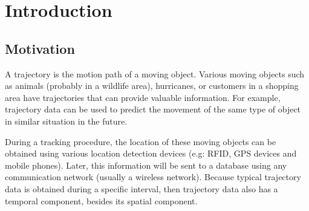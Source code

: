 \chapter{Introduction}
\label{chap:intro}

\section{Motivation}
\label{sec:motivation}

A trajectory is the motion path of a moving object.
Various moving objects such as animals (probably in a wildlife area), hurricanes, or customers in a shopping area have trajectories that can provide valuable information.
For example, trajectory data can be used to predict the movement of the same type of object in similar situation in the future. 

During a tracking procedure, the location of these moving objects can be obtained using various location detection devices (e.g: RFID, GPS devices and mobile phones).
Later, this information will be sent to a database using any communication network (usually a wireless network).
Because typical trajectory data is obtained during a specific interval, then trajectory data also has a temporal component, besides its spatial component.

